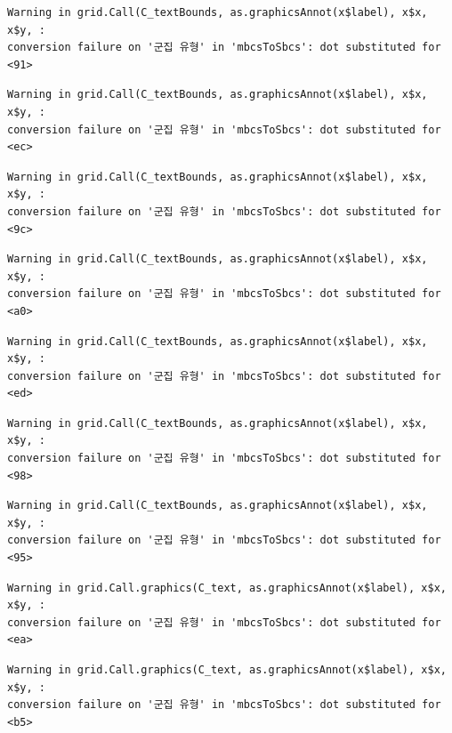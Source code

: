 \documentclass[
  letterpaper,
  DIV=11,
  numbers=noendperiod]{scrreprt}
\begin{document}
\begin{verbatim}
Warning in grid.Call(C_textBounds, as.graphicsAnnot(x$label), x$x, x$y, :
conversion failure on '군집 유형' in 'mbcsToSbcs': dot substituted for <91>
\end{verbatim}

\begin{verbatim}
Warning in grid.Call(C_textBounds, as.graphicsAnnot(x$label), x$x, x$y, :
conversion failure on '군집 유형' in 'mbcsToSbcs': dot substituted for <ec>
\end{verbatim}

\begin{verbatim}
Warning in grid.Call(C_textBounds, as.graphicsAnnot(x$label), x$x, x$y, :
conversion failure on '군집 유형' in 'mbcsToSbcs': dot substituted for <9c>
\end{verbatim}

\begin{verbatim}
Warning in grid.Call(C_textBounds, as.graphicsAnnot(x$label), x$x, x$y, :
conversion failure on '군집 유형' in 'mbcsToSbcs': dot substituted for <a0>
\end{verbatim}

\begin{verbatim}
Warning in grid.Call(C_textBounds, as.graphicsAnnot(x$label), x$x, x$y, :
conversion failure on '군집 유형' in 'mbcsToSbcs': dot substituted for <ed>
\end{verbatim}

\begin{verbatim}
Warning in grid.Call(C_textBounds, as.graphicsAnnot(x$label), x$x, x$y, :
conversion failure on '군집 유형' in 'mbcsToSbcs': dot substituted for <98>
\end{verbatim}

\begin{verbatim}
Warning in grid.Call(C_textBounds, as.graphicsAnnot(x$label), x$x, x$y, :
conversion failure on '군집 유형' in 'mbcsToSbcs': dot substituted for <95>
\end{verbatim}

\begin{verbatim}
Warning in grid.Call.graphics(C_text, as.graphicsAnnot(x$label), x$x, x$y, :
conversion failure on '군집 유형' in 'mbcsToSbcs': dot substituted for <ea>
\end{verbatim}

\begin{verbatim}
Warning in grid.Call.graphics(C_text, as.graphicsAnnot(x$label), x$x, x$y, :
conversion failure on '군집 유형' in 'mbcsToSbcs': dot substituted for <b5>
\end{verbatim}
\end{document}
